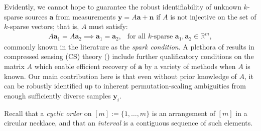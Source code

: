 \documentclass[journal, onecolumn]{IEEEtran}
\begin{document}
Evidently, we cannot hope to guarantee the robust identifiability of unknown $k$-sparse sources $\mathbf{a}$ from measurements $\mathbf{y} = A\mathbf{a} + \mathbf{n}$ if $A$ is not injective on the set of $k$-sparse vectors; that is, $A$ must satisfy:
\begin{align}\label{SparkCondition}
A\mathbf{a}_1 = A\mathbf{a}_2 \implies \mathbf{a}_1 = \mathbf{a}_2, \ \ \text{ for all $k$-sparse } \mathbf{a}_1, \mathbf{a}_2 \in \mathbb{R}^m,
\end{align}
%
commonly known in the literature as the \emph{spark condition}. A plethora of results in compressed sensing (CS) theory (\cite{candes2006near, donoho2006compressed, candes2006stable}) include further qualificatory conditions on the matrix $A$ which enable efficient recovery of $\mathbf{a}$ by a variety of methods when $A$ is known. Our main contribution here is that even without prior knowledge of $A$, it can be robustly identified up to inherent permutation-scaling ambiguities from enough sufficiently diverse samples $\mathbf{y}_i$. 

%

Recall that a \textit{cyclic order} on $[m] := \{1, \ldots,m\}$ is an arrangement of $[m]$ in a circular necklace, and that an \textit{interval} is a contiguous sequence of such elements.  
\end{document}
